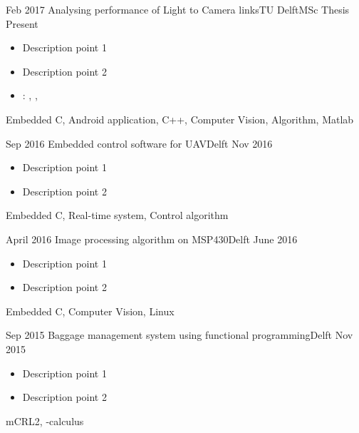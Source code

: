 %
%


 
\begin{experiences}


 \experience
 {Feb 2017}   {Analysing performance of Light to Camera links}{TU Delft}{MSc Thesis}
 {Present} {
 	\begin{itemize}
 		\item Description point 1
 		\item Description point 2
 		\item \faGithub: 
 		,
 		,
 	\end{itemize}
 }
 {Embedded C, Android application, C++, Computer Vision, Algorithm, Matlab}
 \emptySeparator
 
	\experience
	{Sep 2016}   {Embedded control software for UAV}{}{Delft}
	{Nov 2016} {
	 	\begin{itemize}
	 		\item Description point 1
	 		\item Description point 2
	 	\end{itemize}
	}
	{Embedded C, Real-time system, Control algorithm }
	\emptySeparator
	
	\experience
	{April 2016}   {Image processing algorithm on MSP430}{}{Delft}
	{June 2016} {
		\begin{itemize}
			\item Description point 1
			\item Description point 2
		\end{itemize}
	}
	{Embedded C, Computer Vision, Linux }
	\emptySeparator
	
	\experience
	{Sep 2015}   {Baggage management system using functional programming}{}{Delft}
	{Nov 2015} {
	 	\begin{itemize}
	 		\item Description point 1
	 		\item Description point 2
	 	\end{itemize}
	}
	{mCRL2, \mu-calculus }
	\emptySeparator
  

\end{experiences}
